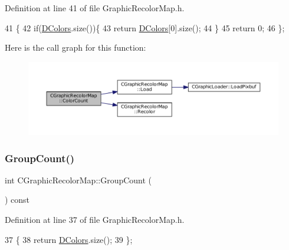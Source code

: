 Definition at line 41 of file Graphic\+Recolor\+Map.\+h.


\begin{DoxyCode}
41                               \{
42             \textcolor{keywordflow}{if}(\hyperlink{classCGraphicRecolorMap_a9dea9a9e96e4465a53a40c4a34cebf71}{DColors}.size())\{
43                 \textcolor{keywordflow}{return} \hyperlink{classCGraphicRecolorMap_a9dea9a9e96e4465a53a40c4a34cebf71}{DColors}[0].size();    
44             \}
45             \textcolor{keywordflow}{return} 0;
46         \};
\end{DoxyCode}
Here is the call graph for this function\+:
\nopagebreak
\begin{figure}[H]
\begin{center}
\leavevmode
\includegraphics[width=350pt]{classCGraphicRecolorMap_a62215bd2082304dc710d0f63af9c9906_cgraph}
\end{center}
\end{figure}
\hypertarget{classCGraphicRecolorMap_a326b3f7b5ba379e2ccc07ffeb1eb69ca}{}\label{classCGraphicRecolorMap_a326b3f7b5ba379e2ccc07ffeb1eb69ca} 
\subsubsection{\texorpdfstring{Group\+Count()}{GroupCount()}}
{\footnotesize\ttfamily int C\+Graphic\+Recolor\+Map\+::\+Group\+Count (\begin{DoxyParamCaption}{ }\end{DoxyParamCaption}) const\hspace{0.3cm}{\ttfamily [inline]}}



Definition at line 37 of file Graphic\+Recolor\+Map.\+h.


\begin{DoxyCode}
37                               \{
38             \textcolor{keywordflow}{return} \hyperlink{classCGraphicRecolorMap_a9dea9a9e96e4465a53a40c4a34cebf71}{DColors}.size();
39         \};
\end{DoxyCode}
\hypertarget{classCGraphicRecolorMap_a71b26547c2e943036278611d048afdfb}{}\label{classCGraphicRecolorMap_a71b26547c2e943036278611d048afdfb} 
